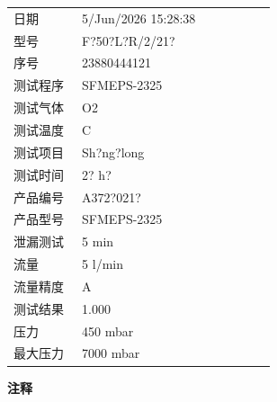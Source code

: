\documentclass[UTF8,10pt,a4paper,fontset=fandol]{ctexart}
\newcommand{\fieldvalue}[1]{#1}
\begin{document}
\begin{tabular}{@{}p{0.24\linewidth}p{0.68\linewidth}@{}}
日期 &
\fieldvalue{5/Jun/2026 15:28:38}
\\[2pt]
型号 &
\fieldvalue{F?50?L?R/2/21?}
\\[2pt]
序号 &
\fieldvalue{23880444121}
\\[2pt]
测试程序 &
\fieldvalue{SFMEPS-2325}
\\[2pt]
测试气体 &
\fieldvalue{O2}
\\[2pt]
测试温度 &
\fieldvalue{C}
\\[2pt]
测试项目 &
\fieldvalue{Sh?ng?long}
\\[2pt]
测试时间 &
\fieldvalue{2? h?}
\\[2pt]
产品编号 &
\fieldvalue{A372?021?}
\\[2pt]
产品型号 &
\fieldvalue{SFMEPS-2325}
\\[2pt]
泄漏测试 &
\fieldvalue{5 min}
\\[2pt]
流量 &
\fieldvalue{5 l/min}
\\[2pt]
流量精度 &
\fieldvalue{A}
\\[2pt]
测试结果 &
\fieldvalue{1.000}
\\[2pt]
压力 &
\fieldvalue{450 mbar}
\\[2pt]
最大压力 &
\fieldvalue{7000 mbar}
\end{tabular}

\vspace{1em}

\textbf{注释}
\end{document}
